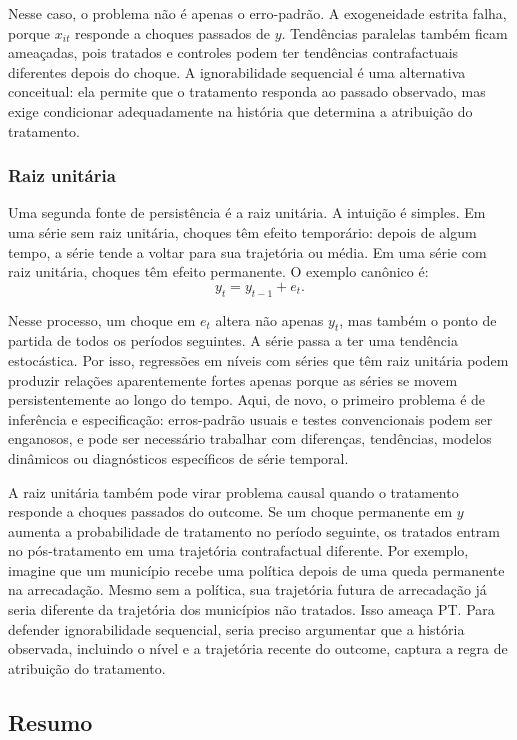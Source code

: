 \documentclass[
]{article}
\begin{document}
Nesse caso, o problema não é apenas o erro-padrão. A exogeneidade estrita falha, porque \(x_{it}\) responde a choques passados de \(y\). Tendências paralelas também ficam ameaçadas, pois tratados e controles podem ter tendências contrafactuais diferentes depois do choque. A ignorabilidade sequencial é uma alternativa conceitual: ela permite que o tratamento responda ao passado observado, mas exige condicionar adequadamente na história que determina a atribuição do tratamento.

\subsubsection{Raiz unitária}\label{raiz-unituxe1ria}

Uma segunda fonte de persistência é a raiz unitária. A intuição é simples. Em uma série sem raiz unitária, choques têm efeito temporário: depois de algum tempo, a série tende a voltar para sua trajetória ou média. Em uma série com raiz unitária, choques têm efeito permanente. O exemplo canônico é:
\[
y_t = y_{t-1} + e_t.
\]

Nesse processo, um choque em \(e_t\) altera não apenas \(y_t\), mas também o ponto de partida de todos os períodos seguintes. A série passa a ter uma tendência estocástica. Por isso, regressões em níveis com séries que têm raiz unitária podem produzir relações aparentemente fortes apenas porque as séries se movem persistentemente ao longo do tempo. Aqui, de novo, o primeiro problema é de inferência e especificação: erros-padrão usuais e testes convencionais podem ser enganosos, e pode ser necessário trabalhar com diferenças, tendências, modelos dinâmicos ou diagnósticos específicos de série temporal.

A raiz unitária também pode virar problema causal quando o tratamento responde a choques passados do outcome. Se um choque permanente em \(y\) aumenta a probabilidade de tratamento no período seguinte, os tratados entram no pós-tratamento em uma trajetória contrafactual diferente. Por exemplo, imagine que um município recebe uma política depois de uma queda permanente na arrecadação. Mesmo sem a política, sua trajetória futura de arrecadação já seria diferente da trajetória dos municípios não tratados. Isso ameaça PT. Para defender ignorabilidade sequencial, seria preciso argumentar que a história observada, incluindo o nível e a trajetória recente do outcome, captura a regra de atribuição do tratamento.

\subsection{Resumo}\label{resumo-1}
\end{document}
